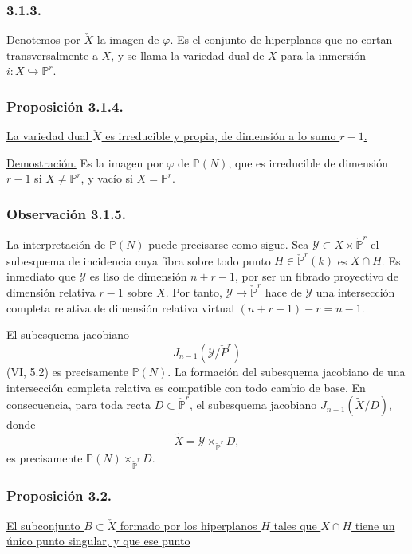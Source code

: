 \pageoriginale

\subsubsection*{3.1.3.}
Denotemos por $\check X$ la imagen de $\varphi$. Es el conjunto de
hiperplanos que no cortan transversalmente a $X$, y se llama la
\underline{variedad dual} de $X$ para la inmersión
$i:X\hookrightarrow\mathbb P^r$.

\subsubsection*{Proposición 3.1.4.}
\underline{La variedad dual $\check X$ es irreducible y propia, de
dimensión a lo sumo $r-1$.}

\noindent\underline{Demostración.}
Es la imagen por $\varphi$ de $\mathbb P(N)$, que es irreducible de
dimensión $r-1$ si $X\ne\mathbb P^r$, y vacío si $X=\mathbb P^r$.

\subsubsection*{Observación 3.1.5.}
La interpretación de $\mathbb P(N)$ puede precisarse como sigue. Sea
$\mathcal Y\subset X\times\check{\mathbb P}^{r}$ el subesquema de
incidencia cuya fibra sobre todo punto
$H\in\check{\mathbb P}^{r}(k)$ es $X\cap H$. Es inmediato que
$\mathcal Y$ es liso de dimensión $n+r-1$, por ser un fibrado
proyectivo de dimensión relativa $r-1$ sobre $X$. Por tanto,
$\mathcal Y\to\check{\mathbb P}^{r}$ hace de $\mathcal Y$ una
intersección completa relativa de dimensión relativa virtual
$(n+r-1)-r=n-1$.

El \underline{subesquema jacobiano}
\[
J_{n-1}(\mathcal Y/\check P^{r})
\]
(VI, 5.2) es precisamente $\mathbb P(N)$. La formación del subesquema
jacobiano de una intersección completa relativa es compatible con todo
cambio de base. En consecuencia, para toda recta
$D\subset\check{\mathbb P}^{r}$, el subesquema jacobiano
$J_{n-1}(\widetilde X/D)$, donde
\[
\widetilde X=\mathcal Y\times_{\check{\mathbb P}^{r}}D,
\]
es precisamente
$\mathbb P(N)\times_{\check{\mathbb P}^{r}}D$.

\subsubsection*{Proposición 3.2.}
\underline{El subconjunto $B\subset\check X$ formado por los
hiperplanos $H$ tales que $X\cap H$ tiene un único punto singular, y
que ese punto}

